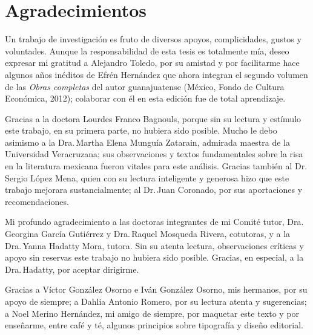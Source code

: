 \documentclass[14pt,twoside,final]{extbook} %
\begin{document}
\chapter*{Agradecimientos}\label{ch:agradecimientos}
\thispagestyle{empty}
\pagestyle{fancy}
\fancyhf{} %
\fancyhead[LE,RO]{\thepage}
\renewcommand{\headrulewidth}{0.4pt}
\setcounter{page}{5}
Un trabajo de investigación es fruto de diversos apoyos, complicidades, gustos y voluntades. Aunque la responsabilidad de esta tesis es totalmente mía, deseo expresar mi gratitud a Alejandro Toledo, por su amistad y por facilitarme hace algunos años inéditos de Efrén Hernández que ahora integran el segundo volumen de las \emph{Obras completas} del autor guanajuatense (México, Fondo de Cultura Económica, 2012); colaborar con él en esta edición fue de total aprendizaje.

Gracias a la doctora Lourdes Franco Bagnouls, porque sin su lectura y estímulo este trabajo, en su primera parte, no hubiera sido posible. Mucho le debo asimismo a la Dra.\,Martha Elena Munguía Zatarain, admirada maestra de la Universidad Veracruzana; sus observaciones y textos fundamentales sobre la risa en la literatura mexicana fueron vitales para este análisis. Gracias también al Dr.\,Sergio López Mena, quien con su lectura inteligente y generosa hizo que este trabajo mejorara sustancialmente; al Dr.\,Juan Coronado, por sus aportaciones y recomendaciones.

Mi profundo agradecimiento a las doctoras integrantes de mi Comité tutor, Dra.\,Georgina García Gutiérrez y Dra.\,Raquel Mosqueda Rivera, cotutoras, y a la Dra.\,Yanna Hadatty Mora, tutora. Sin su atenta lectura, observaciones críticas y apoyo sin reservas este trabajo no hubiera sido posible. Gracias, en especial, a la Dra.\,Hadatty, por aceptar dirigirme.

Gracias a Víctor González Osorno e Iván González Osorno, mis hermanos, por su apoyo de siempre; a Dahlia Antonio Romero, por su lectura atenta y sugerencias; a Noel Merino Hernández, mi amigo de siempre, por maquetar este texto y por enseñarme, entre café y té, algunos principios sobre tipografía y diseño editorial.
\end{document}

